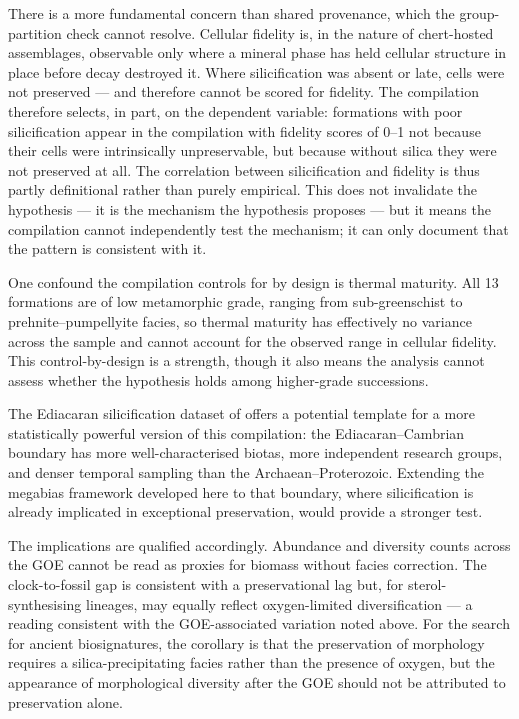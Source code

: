 \documentclass[11pt]{article}
\begin{document}
There is a more fundamental concern than shared provenance, which the group-partition check cannot
resolve. Cellular fidelity is, in the nature of chert-hosted assemblages, observable only where a
mineral phase has held cellular structure in place before decay destroyed it. Where silicification
was absent or late, cells were not preserved --- and therefore cannot be scored for fidelity. The
compilation therefore selects, in part, on the dependent variable: formations with poor
silicification appear in the compilation with fidelity scores of 0--1 not because their cells were
intrinsically unpreservable, but because without silica they were not preserved at all. The
correlation between silicification and fidelity is thus partly definitional rather than purely
empirical. This does not invalidate the hypothesis --- it is the mechanism the hypothesis proposes
--- but it means the compilation cannot independently test the mechanism; it can only document that
the pattern is consistent with it.

One confound the compilation controls for by design is thermal maturity. All 13 formations are of
low metamorphic grade, ranging from sub-greenschist to prehnite--pumpellyite facies, so thermal
maturity has effectively no variance across the sample and cannot account for the observed range in
cellular fidelity. This control-by-design is a strength, though it also means the analysis cannot
assess whether the hypothesis holds among higher-grade successions.

The Ediacaran silicification dataset of \citet{Tarhan2016} offers a potential template for a more
statistically powerful version of this compilation: the Ediacaran--Cambrian boundary has more
well-characterised biotas, more independent research groups, and denser temporal sampling than the
Archaean--Proterozoic. Extending the megabias framework developed here to that boundary, where
silicification is already implicated in exceptional preservation, would provide a stronger test.

The implications are qualified accordingly. Abundance and diversity counts across the GOE cannot be
read as proxies for biomass without facies correction. The clock-to-fossil gap is consistent with a
preservational lag but, for sterol-synthesising lineages, may equally reflect oxygen-limited
diversification --- a reading consistent with the GOE-associated variation noted above. For the
search for ancient biosignatures, the corollary is
that the preservation of morphology requires a silica-precipitating facies rather than the presence
of oxygen, but the appearance of morphological diversity after the GOE should not be attributed to
preservation alone.
\end{document}
